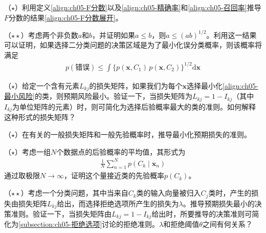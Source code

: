 \documentclass[../../main.tex]{subfiles}
\begin{document}
\begin{exercise}\label{exercise:ch05-05}
（$\star$）利用定义\eqref{align:ch05-F分数}以及\eqref{align:ch05-精确率}和\eqref{align:ch05-召回率}推导$F$分数的结果\eqref{align:ch05-F分数展开}。
\end{exercise}

\begin{exercise}\label{exercise:ch05-06}
（$\star\star$）考虑两个非负数$a$和$b$，并证明如果$a\leqslant b$，则$a\leqslant(ab)^{1/2}$。利用这一结果可以证明，如果选择二分类问题的决策区域是为了最小化误分类概率，则该概率将满足
\begin{align}
  p(\text{错误})\leqslant\int\bigl\{p(\boldsymbol{x},C_1)\,p(\boldsymbol{x},C_2)\bigr\}^{1/2}\mathrm{d}\boldsymbol{x}
  \label{align:ch05-习题错误界}
\end{align}
\end{exercise}

\begin{exercise}\label{exercise:ch05-07}
（$\star$）给定一个含有元素$L_{kj}$的损失矩阵，如果我们为每个$\boldsymbol{x}$选择最小化\eqref{align:ch05-最小风险}的类，则预期风险最小。验证一下，当损失矩阵为$L_{kj}=1-I_{kj}$（其中$I_{kj}$为单位矩阵的元素）时，则可简化为选择后验概率最大的类的准则。如何解释这种形式的损失矩阵？
\end{exercise}

\begin{exercise}\label{exercise:ch05-08}
（$\star$）在有关的一般损失矩阵和一般先验概率时，推导最小化预期损失的准则。
\end{exercise}

\begin{exercise}\label{exercise:ch05-09}
（$\star$）考虑一组$N$个数据点的后验概率的平均值，其形式为
\begin{align}
  \frac{1}{N}\sum_{n=1}^{N}p(C_k\mid\boldsymbol{x}_n)
  \label{align:ch05-习题后验平均}
\end{align}
通过取极限$N\to\infty$，证明这个量接近类的先验概率$p(C_k)$。
\end{exercise}

\begin{exercise}\label{exercise:ch05-10}
（$\star\star$）考虑一个分类问题，其中当来自$C_k$类的输入向量被归入$C_j$类时，产生的损失由损失矩阵$L_{kj}$给出，而选择拒绝选项所产生的损失为$\lambda$。推导预期损失最小的决策准则。验证一下，当损失矩阵由$L_{kj}=1-I_{kj}$给出时，所要推导的决策准则可简化为\cref{subsection:ch05-拒绝选项}讨论的拒绝准则。$\lambda$和拒绝阈值$\theta$之间有何关系？
\end{exercise}
\end{document}
